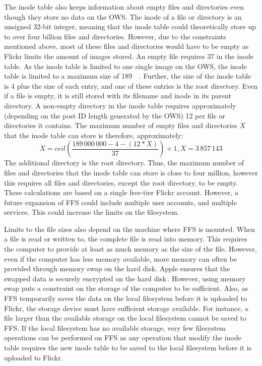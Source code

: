 The inode table also keeps information about empty files and directories even though they store no data on the OWS. The inode of a file or directory is an unsigned 32-bit integer, meaning that the inode table could theoretically store up to over four billion files and directories. However, due to the constraints mentioned above, most of these files and directories would have to be empty as Flickr limits the amount of images stored. An empty file requires \SI{37}{\byte} in the inode table. As the inode table is limited to one single image on the OWS, the inode table is limited to a maximum size of \SI{189}{\mega\byte}. Further, the size of the inode table is \SI{4}{\byte} plus the size of each entry, and one of these entries is the root directory. Even if a file is empty, it is still stored with its filename and inode in its parent directory. A non-empty directory in the inode table requires approximately (depending on the post ID length generated by the OWS) \SI{12}{\byte} per file or directories it contains. The maximum number of empty files and directories $X$ that the inode table can store is therefore, approximately:
$$
	X = ceil(\frac{189\,000\,000 - 4 - (12 * X)}{37}) + 1, X = 3\,857\,143
$$
The additional directory is the root directory. Thus, the maximum number of files and directories that the inode table can store is close to four million, however this requires all files and directories, except the root directory, to be empty. These calculations are based on a single free-tier Flickr account. However, a future expansion of FFS could include multiple user accounts, and multiple services. This could increase the limits on the filesystem.

Limits to the file sizes also depend on the machine where FFS is mounted. When a file is read or written to, the complete file is read into memory. This requires the computer to provide at least as much memory as the size of the file. However, even if the computer has less memory available, more memory can often be provided through memory swap on the hard disk. Apple ensures that the swapped data is securely encrypted on the hard disk\,\cite{appleinc.WhatSecureVirtual}. However, using memory swap puts a constraint on the storage of the computer to be sufficient. Also, as FFS temporarily saves the data on the local filesystem before it is uploaded to Flickr, the storage device must have sufficient storage available. For instance, a file larger than the available storage on the local filesystem cannot be saved to FFS. If the local filesystem has no available storage, very few filesystem operations can be performed on FFS as any operation that modify the inode table requires the new inode table to be saved to the local filesystem before it is uploaded to Flickr. 


